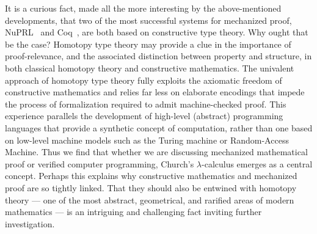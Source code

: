 \documentclass[11pt]{article}
\theoremstyle{remark}
\theoremstyle{definition}
\begin{document}

It is a curious fact, made all the more interesting by the above-mentioned developments, that two of the most successful
systems for mechanized proof, NuPRL~\cite{NuPRL} and Coq~\cite{Coq}, are both based on constructive type theory.  Why
ought that be the case?  Homotopy type theory may provide a clue in the importance of proof-relevance, and the
associated distinction between property and structure, in both classical homotopy theory and constructive mathematics.
The univalent approach of homotopy type theory fully exploits the axiomatic freedom of 
constructive mathematics and relies far less on elaborate encodings that impede the process of formalization required to admit machine-checked proof.  This experience parallels the development of
high-level (abstract) programming languages that provide a synthetic concept of computation, rather than one based on
low-level machine models such as the Turing machine or Random-Access Machine.  Thus we find that whether we are
discussing mechanized mathematical proof or verified computer programming, Church's $\lambda$-calculus emerges as a
central concept.  Perhaps this explains why constructive mathematics and mechanized proof are so tightly linked.  That
they should also be entwined with homotopy theory --- one of the most abstract, geometrical, and rarified areas of
modern mathematics --- is an intriguing and challenging fact inviting further investigation.















\end{document}

